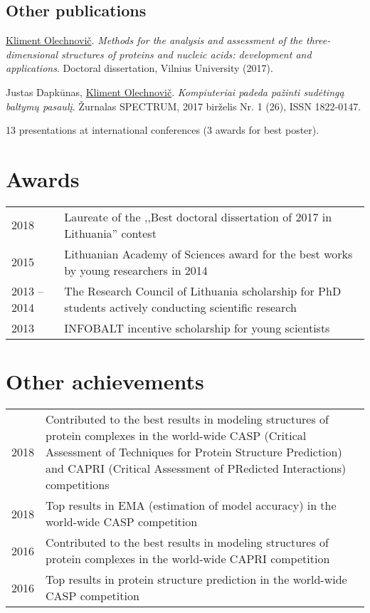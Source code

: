 \documentclass{article}
\newenvironment{itemize_tight}{
\begin{itemize}
  \setlength{\itemsep}{2pt}
  \setlength{\parskip}{0pt}
  \setlength{\parsep}{0pt}
}{\end{itemize}}
\begin{document}
\subsection*{Other publications}
\begin{itemize_tight}
  \item \underline{Kliment Olechnovič}.
        \emph{Methods for the analysis and assessment of the three-dimensional structures of proteins and nucleic acids: development and applications}.
        Doctoral dissertation, Vilnius University (2017).
  \item Justas Dapkūnas, \underline{Kliment Olechnovič}.
        \emph{Kompiuteriai padeda pažinti sudėtingą baltymų pasaulį}.
        Žurnalas SPECTRUM, 2017 birželis Nr. 1 (26), ISSN 1822-0147.
  \item 13 presentations at international conferences (3 awards for best poster).
\end{itemize_tight}


\section*{Awards}
\begin{tabular}{p{}p{}}
2018 & Laureate of the ,,Best doctoral dissertation of 2017 in Lithuania'' contest \\
2015 & Lithuanian Academy of Sciences award for the best works by young researchers in 2014 \\
2013 -- 2014 & The Research Council of Lithuania scholarship for PhD students actively conducting scientific research \\
2013 & INFOBALT incentive scholarship for young scientists
\end{tabular}


\section*{Other achievements}
\begin{tabular}{p{}p{}}
2018 & Contributed to the best results in modeling structures of protein complexes
       in the world-wide CASP (Critical Assessment of Techniques for Protein Structure Prediction)
       and CAPRI (Critical Assessment of PRedicted Interactions) competitions \\
2018 & Top results in EMA (estimation of model accuracy)
       in the world-wide CASP competition \\
2016 & Contributed to the best results in modeling structures of protein complexes
       in the world-wide CAPRI competition \\
2016 & Top results in protein structure prediction
       in the world-wide CASP competition
\end{tabular}
\end{document}
